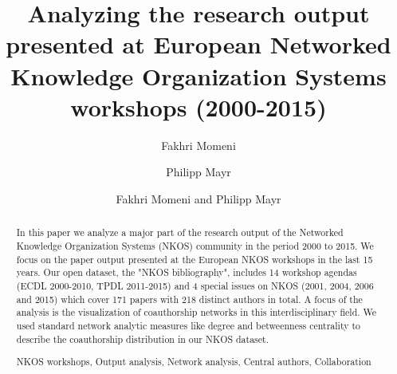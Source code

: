 \documentclass[runningheads,a4paper]{llncs}
\newcommand{\keywords}[1]{\par\addvspace\baselineskip
\noindent\keywordname\enspace\ignorespaces#1}
\begin{document}
\mainmatter  %

\title{Analyzing the research output presented at European Networked Knowledge Organization Systems workshops (2000-2015)}



%
%
\author{Fakhri Momeni%
	\and Philipp Mayr}
%

\author{Fakhri Momeni and Philipp Mayr}

%
%

\maketitle


\begin{abstract}		
In this paper we analyze a major part of the research output of the Networked Knowledge Organization Systems (NKOS) community in the period 2000 to 2015. We focus on the paper output presented at the European NKOS workshops in the last 15 years. Our open dataset, the "NKOS bibliography", includes 14 workshop agendas (ECDL 2000-2010, TPDL 2011-2015) and 4 special issues on NKOS (2001, 2004, 2006 and 2015) which cover 171 papers with 218 distinct authors in total. A focus of the analysis is the visualization of coauthorship networks in this interdisciplinary field. We used standard network analytic measures like degree and betweenness centrality to describe the coauthorship distribution in our NKOS dataset. %


 
\keywords{NKOS workshops, Output analysis, Network analysis, Central authors, Collaboration}
\end{abstract}
\end{document}
